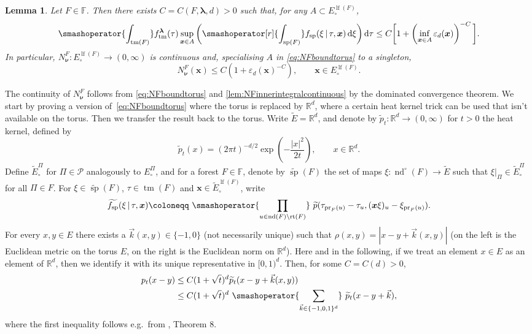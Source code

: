 \documentclass[reqno,draft]{amsart}
\numberwithin{equation}{section}
\theoremstyle{plain}
\newtheorem{lemma}[theorem]{Lemma}
\theoremstyle{remark}
\newcommand{\R}{\mathbb{R}} %
\newcommand*\diff{\mathop{}\!\mathrm{d}}
\DeclareMathOperator{\pr}{pr}
\newcommand{\fpart}{\Pi} %
\DeclareMathOperator{\lf}{lf}
\DeclareMathOperator{\rt}{rt}
\DeclareMathOperator{\nd}{nd}
\DeclareMathOperator{\dct}{tm}
\DeclareMathOperator{\dcs}{sp}
\newcommand{\rfy}[1]{\widetilde{{#1}}} %
\newcommand{\smashop}[1]{\,\,\smashoperator{#1}\,\,}
\newcommand{\ftm}{f_\mathrm{tm}^{\boldsymbol \lambda}}
\newcommand{\fsp}{f_\mathrm{sp}}
\begin{document}
\begin{lemma}\label{lem:app:NF}
    Let $F \in \mathbb{F}$. Then there exists $C = C(F,\boldsymbol \lambda,d) > 0$ such that, for any $A \subset E^{\lf(F)}_\circ $,
    \begin{equation}\label{eq:NFboundtorus}
        \smashoperator{\int_{\dct(F)}} \ftm(\tau) \sup_{\boldsymbol x\in A} \bigg( \smashoperator[r]{\int_{\dcs(F)}} \fsp(\xi \,\vert\,\tau,\boldsymbol x) \diff \xi \bigg) \diff \tau
        \le C \bigg[ 1 + \left( \inf_{\boldsymbol x\in A} \varepsilon_d(\boldsymbol x) \right) ^{-C} \bigg] .
        \end{equation}
        In particular, $N_{\boldsymbol \nu}^F \colon E^{\lf(F)}_\circ \to (0,\infty)$ is continuous and, specialising $A$ in \cref{eq:NFboundtorus} to a singleton, \[
        N^F_{\boldsymbol \nu}(\boldsymbol x) \le C \left( 1 + \varepsilon_d(\boldsymbol x)^{-C} \right) ,\qquad \boldsymbol x\in E^{\lf(F)}_\circ .
    \]
\end{lemma}

The continuity of $N^F_{\boldsymbol \nu}$ follows from \cref{eq:NFboundtorus} and \cref{lem:NFinnerintegralcontinuous} by the dominated convergence theorem. We start by proving a version of~\eqref{eq:NFboundtorus} where the torus is replaced by $\R^d$, where a certain heat kernel trick can be used that isn't available on the torus. Then we transfer the result back to the torus. Write $\rfy{E} = \R^d$, and denote by $\rfy{p}_t \colon \R^d \to (0,\infty)$ for $t > 0$ the heat kernel, defined by \[
    \rfy{p}_t(x) = (2\pi t)^{-d / 2} \exp\left(-\frac{|x|^2}{2t}\right),\qquad x\in \R^d.
\] Define $\rfy{E}^{\fpart}_\circ $ for $\fpart\in \mathcal{P}$ analogously to $E^{\fpart}_\circ $, and for a forest $F\in \mathbb{F}$, denote by $\rfy{\dcs}(F)$ the set of maps $\xi\colon \nd^\circ (F) \to \rfy{E}$ such that $\xi\big\vert_{\fpart} \in \rfy{E}^\fpart_\circ $ for all $\fpart \in F$. For $\xi\in \rfy{\dcs}(F)$, $\tau\in \dct(F)$ and $\boldsymbol x\in \rfy{E}^{\lf(F)}_\circ $, write
\begin{equation*}
    \rfy{\fsp}(\xi\,\vert\, \tau,\boldsymbol x) \coloneqq  \smashop{\prod_{u\in \nd(F)\setminus \rt(F) }} \rfy{p}(\tau_{\pr_F(u)} - \tau_u, (\boldsymbol x \xi)_u - \xi_{\pr_F(u)}).
\end{equation*}
For every $x,y\in E$ there exists a $\vec{k}(x,y) \in \{-1,0\}$ (not necessarily unique) such that $\rho(x,y) = |x-y+\vec{k}(x,y)|$ (on the left is the Euclidean metric on the torus $E$, on the right is the Euclidean norm on $\R^d$). Here and in the following, if we treat an element $x\in E$ as an element of $\R^d$, then we identify it with its unique representative in $[0,1)^d$. Then, for some $C = C(d) > 0$,
\begin{align}\label{eq:app:ptbound}
    p_t(x-y)
    &\le C(1 + \sqrt{t} )^d \rfy{p}_t(x-y+\vec{k}(x,y))\nonumber \\
    &\le C(1+\sqrt{t} )^d \smashop{\sum_{\vec{k}\in \{-1,0,1\}^d}} \rfy{p}_t(x - y + \vec{k}),
\end{align}
where the first inequality follows e.g.\ from \cite{heatkerneltorus}, Theorem 8.
\end{document}
